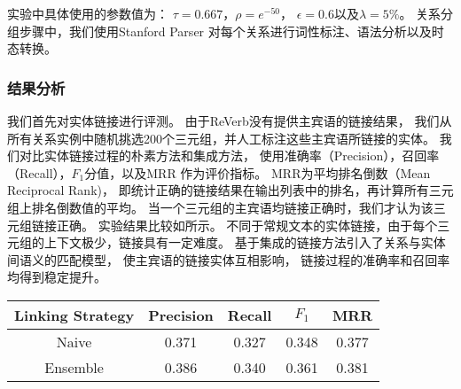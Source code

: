 实验中具体使用的参数值为：
$\tau = 0.667$，$\rho = e^{-50}$，
$\epsilon=0.6$以及$\lambda = 5\%$。
关系分组步骤中，我们使用Stanford Parser\cite{klein2003accurate}
对每个关系进行词性标注、语法分析以及时态转换。



\subsubsection{结果分析}
我们首先对实体链接进行评测。
由于ReVerb没有提供主宾语的链接结果，
我们从所有关系实例中随机挑选200个三元组，并人工标注这些主宾语所链接的实体。
我们对比实体链接过程的朴素方法和集成方法，
使用准确率（Precision），召回率（Recall），$F_1$分值，以及MRR\cite{liu2009learning}
作为评价指标。
MRR为平均排名倒数（Mean Reciprocal Rank)，
即统计正确的链接结果在输出列表中的排名，再计算所有三元组上排名倒数值的平均。
当一个三元组的主宾语均链接正确时，我们才认为该三元组链接正确。
实验结果比较如所示。
不同于常规文本的实体链接，由于每个三元组的上下文极少，链接具有一定难度。
基于集成的链接方法引入了关系与实体间语义的匹配模型，
使主宾语的链接实体互相影响，
链接过程的准确率和召回率均得到稳定提升。


\begin{table}[ht]
	\centering
	\begin{tabular}{c|cccc}
        \hline
	    Linking Strategy & Precision & Recall & $F_1$ & MRR \\
        \hline
        Naive    & 0.371 & 0.327 & 0.348 & 0.377 \\
        Ensemble & 0.386 & 0.340 & 0.361 & 0.381 \\
        \hline
	\end{tabular}%
	\label{tab:tinf-linking}%
\end{table}


